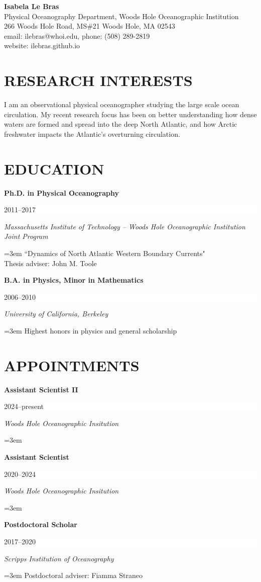 \documentclass[paper=letter,fontsize=11pt]{scrartcl} %
\newcommand{\sepspace}{\vspace*{3mm}}		%
\newcommand{\NewPart}[2]{\section*{\uppercase{#1} #2}}
\newcommand{\EducationEntry}[4]{
		\noindent \textbf{#1} \hfill      %
		\colorbox{White}{%
			\parbox{8em}{%
			\hfill\color{Black}#2}} \par  %
		\noindent \textit{#3} \par        %
		\noindent\hangindent=3em\hangafter=0 #4 %
		 \par}
\begin{document}


\begin{center}
\Large{\textbf{Isabela Le Bras}}\\
\normalsize{
Physical Oceanography Department, Woods Hole Oceanographic Institution\\
266 Woods Hole Road, MS\#21 Woods Hole, MA 02543\\
email: ilebras@whoi.edu, phone: (508) 289-2819\\
website: ilebras.github.io
}
\end{center}


\NewPart{Research Interests}{}
I am an observational physical oceanographer studying the large scale ocean circulation. My recent research focus has been on better understanding how dense waters are formed and spread into the deep North Atlantic, and how Arctic freshwater impacts the Atlantic's overturning circulation.

\NewPart{Education}{}

\EducationEntry{Ph.D. in Physical Oceanography}{2011--2017}{Massachusetts Institute of Technology -- Woods Hole Oceanographic Institution Joint Program}{``Dynamics of North Atlantic Western Boundary Currents"\\
Thesis adviser: John M. Toole}
\sepspace

\EducationEntry{B.A. in Physics, Minor in Mathematics}{2006--2010}{University of California, Berkeley}{Highest honors in physics and general scholarship}

\NewPart{Appointments}{}

\EducationEntry{{Assistant Scientist II}}{2024--present}{Woods Hole Oceanographic Insitution}{}

\EducationEntry{{Assistant Scientist}}{2020--2024}{Woods Hole Oceanographic Insitution}{}


\EducationEntry{{Postdoctoral Scholar}}{2017--2020}{Scripps Institution of Oceanography}{Postdoctoral adviser: Fiamma Straneo}
\end{document}
